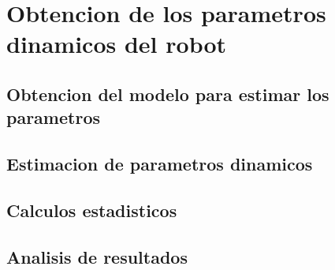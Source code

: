 \section{Obtencion de los parametros dinamicos del robot}
	\subsection{Obtencion del modelo para estimar los parametros}
	\subsection{Estimacion de parametros dinamicos}
	\subsection{Calculos estadisticos}
	\subsection{Analisis de resultados}